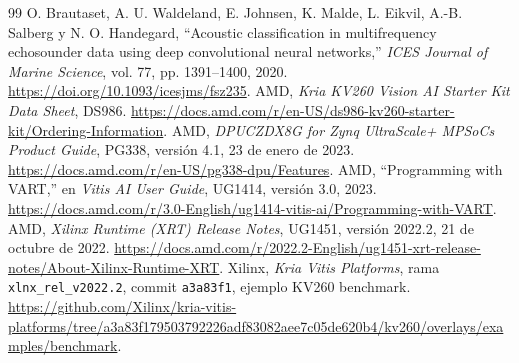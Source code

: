 \documentclass[10pt,conference,a4paper]{elektron}
\begin{document}
\begin{thebibliography}{99}
O. Brautaset, A. U. Waldeland, E. Johnsen, K. Malde, L. Eikvil, A.-B. Salberg y N. O. Handegard, ``Acoustic classification in multifrequency echosounder data using deep convolutional neural networks,'' \emph{ICES Journal of Marine Science}, vol. 77, pp. 1391--1400, 2020. \url{https://doi.org/10.1093/icesjms/fsz235}.
AMD, \emph{Kria KV260 Vision AI Starter Kit Data Sheet}, DS986. \url{https://docs.amd.com/r/en-US/ds986-kv260-starter-kit/Ordering-Information}.
AMD, \emph{DPUCZDX8G for Zynq UltraScale+ MPSoCs Product Guide}, PG338, versión 4.1, 23 de enero de 2023. \url{https://docs.amd.com/r/en-US/pg338-dpu/Features}.
AMD, ``Programming with VART,'' en \emph{Vitis AI User Guide}, UG1414, versión 3.0, 2023. \url{https://docs.amd.com/r/3.0-English/ug1414-vitis-ai/Programming-with-VART}.
AMD, \emph{Xilinx Runtime (XRT) Release Notes}, UG1451, versión 2022.2, 21 de octubre de 2022. \url{https://docs.amd.com/r/2022.2-English/ug1451-xrt-release-notes/About-Xilinx-Runtime-XRT}.
Xilinx, \emph{Kria Vitis Platforms}, rama \texttt{xlnx\_rel\_v2022.2}, commit \texttt{a3a83f1}, ejemplo KV260 benchmark. \url{https://github.com/Xilinx/kria-vitis-platforms/tree/a3a83f179503792226adf83082aee7c05de620b4/kv260/overlays/examples/benchmark}.
\end{thebibliography}
\end{document}
